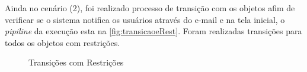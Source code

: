 \par
Ainda no cenário (2), foi realizado processo de transição com os objetos afim de verificar se o sistema notifica os usuários através do e-mail e na tela inicial, o \textit{pipiline} da execução esta na \autoref{fig:transicaoeRest}. Foram realizadas transições para todos os objetos com restrições.

\begin{figure}[ht]
        \centering\caption{Transições com Restrições}
        \label{fig:transicaoeRest}
         \hspace{0.5cm}
             \hspace{0.5cm}
        \hspace{0.5cm}

\end{figure}
